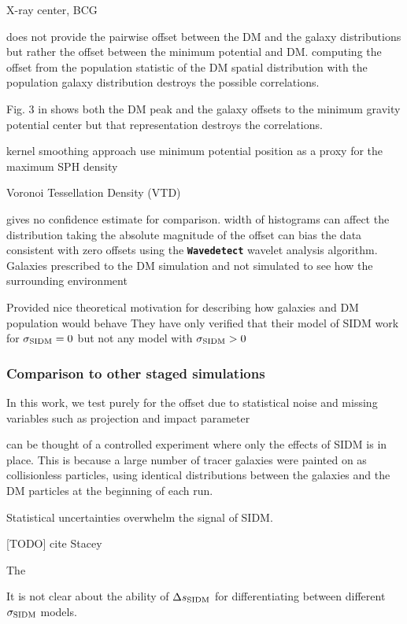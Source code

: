 \cite{Cui2015} X-ray center, BCG

does not provide the pairwise offset between the DM and the galaxy distributions
but rather the offset between the minimum potential and DM. 
computing the offset from the population statistic of the DM spatial distribution 
with the population galaxy distribution destroys the possible correlations.

Fig. 3 in \cite{Cui2015} shows both the DM peak and the galaxy offsets to the 
minimum gravity potential center but that representation destroys the 
correlations. 

kernel smoothing approach
use minimum potential position as a proxy for the maximum SPH density 

Voronoi Tessellation Density (VTD)

gives no confidence estimate for comparison. 
width of histograms can affect the distribution  
taking the absolute magnitude of the offset can bias the data  
\cite{Harvey2013d} consistent with zero offsets using the {\bf
\texttt{Wavedetect}} wavelet analysis algorithm. 
Galaxies prescribed to the DM simulation and not simulated to see 
how the surrounding environment  


Provided nice theoretical motivation for describing how galaxies and DM
population would behave 
They have only verified that their model of SIDM work for 
$\sigma_{\rm SIDM} = 0$ but not any model with $\sigma_{\rm SIDM} > 0$

\subsubsection{Comparison to other staged simulations}

In this work, we test purely for the offset due to statistical noise and
missing variables such as projection and impact parameter 

\cite{Randall2008d} can be thought of a controlled experiment where 
only the effects of SIDM is in place.
This is because a large number of tracer galaxies were painted on as 
collisionless particles, using identical distributions between the galaxies 
and the DM particles at the beginning of each run. 

Statistical uncertainties overwhelm the signal of SIDM.

\cite{Robertson2016}


[TODO] cite Stacey

The 

It is not clear about the ability of $\Delta s_{\rm SIDM}$ for differentiating 
between different $\sigma_{\rm SIDM}$ models. 

